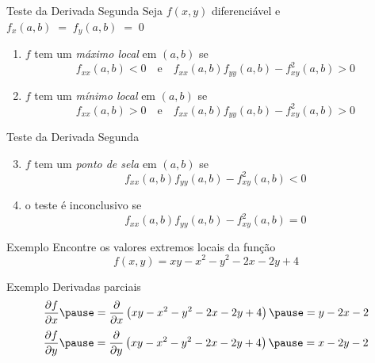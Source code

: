 \begin{frame}{Teste da Derivada Segunda}
  Seja $f(x, y)$ diferenciável e
  \(
    f_x(a, b) \;=\; f_y(a, b) \;=\; 0
  \)

  \pause
  \vspace{\baselineskip}
  \begin{enumerate}[<+->]
    \item $f$ tem um \emph{máximo local} em $(a, b)$ se
    \[
      f_{xx}(a, b) \bm{<} 0
      \quad\text{e}\quad
      f_{xx}(a, b) f_{yy}(a, b) - f^2_{xy}(a, b) \bm{>} 0
    \]
    \item $f$ tem um \emph{mínimo local} em $(a, b)$ se
    \[
      f_{xx}(a, b) \bm{>} 0
      \quad\text{e}\quad
      f_{xx}(a, b) f_{yy}(a, b) - f^2_{xy}(a, b) \bm{>} 0
    \]
  \end{enumerate}
\end{frame}

\begin{frame}{Teste da Derivada Segunda}
\begin{enumerate}[<+->]
  \setcounter{enumi}{2}
  \item $f$ tem um \emph{ponto de sela} em $(a, b)$ se
  \[
    f_{xx}(a, b) f_{yy}(a, b) - f^2_{xy}(a, b) \bm{<} 0
  \]
  \item o teste é inconclusivo se
  \[
    f_{xx}(a, b) f_{yy}(a, b) - f^2_{xy}(a, b) \bm{=} 0
  \]
\end{enumerate}
\end{frame}

\addtocounter{exemplo}{1}
\begin{frame}{Exemplo \theexemplo}
  Encontre os valores extremos locais da função
  \[
    f(x, y) = xy -x^2 - y^2 -2x -2y +4
  \]
\end{frame}

\begin{frame}{Exemplo \theexemplo}
  Derivadas parciais
  \pause
  \vspace{\baselineskip}
  \[
    \D{f}{x}
    \pause
    = \D{}{x}\left(xy -x^2 - y^2 -2x -2y +4\right)
    \pause
    = y -2x -2
  \]
  \pause
  \vspace{\baselineskip}
  \[
    \D{f}{y}
    \pause
    = \D{}{y}\left(xy -x^2 - y^2 -2x -2y +4\right)
    \pause
    = x -2y -2
  \]
\end{frame}

